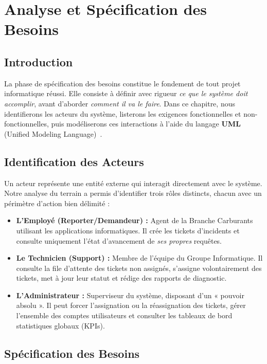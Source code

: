\chapter{Analyse et Spécification des Besoins}

\section{Introduction}
La phase de spécification des besoins constitue le fondement de tout projet
informatique réussi. Elle consiste à définir avec rigueur \textit{ce que le système doit
accomplir}, avant d'aborder \textit{comment il va le faire}. Dans ce chapitre, nous
identifierons les acteurs du système, listerons les exigences fonctionnelles et
non-fonctionnelles, puis modéliserons ces interactions à l'aide du langage \textbf{UML}
(Unified Modeling Language)~\cite{roques2006}.

\section{Identification des Acteurs}
Un acteur représente une entité externe qui interagit directement avec le système.
Notre analyse du terrain a permis d'identifier trois rôles distincts, chacun avec un
périmètre d'action bien délimité :
\begin{itemize}
    \item \textbf{L'Employé (Reporter/Demandeur) :} Agent de la Branche Carburants
    utilisant les applications informatiques. Il crée les tickets d'incidents et consulte
    uniquement l'état d'avancement de \textit{ses propres} requêtes.
    \item \textbf{Le Technicien (Support) :} Membre de l'équipe du Groupe Informatique.
    Il consulte la file d'attente des tickets non assignés, s'assigne volontairement des
    tickets, met à jour leur statut et rédige des rapports de diagnostic.
    \item \textbf{L'Administrateur :} Superviseur du système, disposant d'un
    « pouvoir absolu ». Il peut forcer l'assignation ou la réassignation des tickets,
    gérer l'ensemble des comptes utilisateurs et consulter les tableaux de bord
    statistiques globaux (KPIs).
\end{itemize}

\section{Spécification des Besoins}


